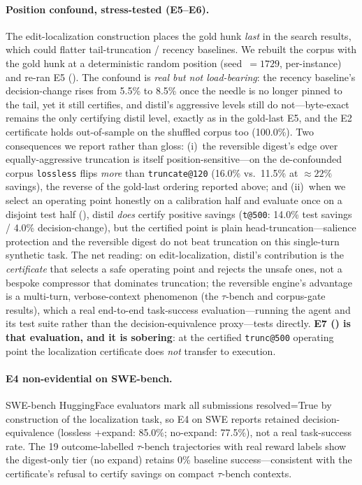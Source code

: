 \documentclass[11pt]{article}
\makeatletter
\newcommand{\OrigRecencyDC}{5.5\%}   \newcommand{\OrigRecencySav}{16.1\%}
\newcommand{\ShufRecencyDC}{8.5\%}   \newcommand{\ShufRecencySav}{15.9\%}
\newcommand{\ShufLosslessDC}{16.0\%} \newcommand{\ShufLosslessSav}{21.7\%}
\newcommand{\ShufTruncShortDC}{11.5\%} \newcommand{\ShufTruncShortSav}{22.8\%}
\newcommand{\ShufCoverage}{100.0\%}
\newcommand{\SweepPoint}{\texttt{t@500}}
\newcommand{\SweepTestSav}{14.0\%}
\newcommand{\SweepTestDC}{4.0\%}
\makeatother
\begin{document}
\paragraph{Position confound, stress-tested (E5--E6).} The edit-localization
construction places the gold hunk \emph{last} in the search results, which could
flatter tail-truncation / recency baselines. We rebuilt the corpus with the gold
hunk at a deterministic random position (seed~$=1729$, per-instance) and re-ran E5
(). The confound is \emph{real but not load-bearing}: the recency
baseline's decision-change rises from \OrigRecencyDC{} to \ShufRecencyDC{} once the
needle is no longer pinned to the tail, yet it still certifies, and distil's
aggressive levels still do not---byte-exact remains the only certifying distil level,
exactly as in the gold-last E5, and the E2 certificate holds out-of-sample on the
shuffled corpus too (\ShufCoverage{}). Two consequences we report rather than gloss:
(i)~the reversible digest's edge over equally-aggressive truncation is itself
position-sensitive---on the de-confounded corpus \texttt{lossless} flips
\emph{more} than \texttt{truncate@120} (\ShufLosslessDC{} vs.\ \ShufTruncShortDC{} at
$\approx22\%$ savings), the reverse of the gold-last ordering reported above; and
(ii)~when we select an operating point honestly on a calibration half and evaluate
once on a disjoint test half (), distil \emph{does} certify positive
savings (\SweepPoint{}: \SweepTestSav{} test savings / \SweepTestDC{} decision-change),
but the certified point is plain head-truncation---salience protection and the
reversible digest do not beat truncation on this single-turn synthetic task. The
net reading: on edit-localization, distil's contribution is the \emph{certificate}
that selects a safe operating point and rejects the unsafe ones, not a bespoke
compressor that dominates truncation; the reversible engine's advantage is a
multi-turn, verbose-context phenomenon (the $\tau$-bench and corpus-gate results),
which a real end-to-end task-success evaluation---running the agent and its test
suite rather than the decision-equivalence proxy---tests directly. \textbf{E7
() is that evaluation, and it is sobering}: at the certified
\texttt{trunc@500} operating point the localization certificate does \emph{not}
transfer to execution.

\paragraph{E4 non-evidential on SWE-bench.} SWE-bench HuggingFace evaluators mark
all submissions resolved=True by construction of the localization task, so E4 on
SWE reports retained decision-equivalence (lossless $+$expand: 85.0\%; no-expand:
77.5\%), not a real task-success rate. The 19 outcome-labelled $\tau$-bench
trajectories with real reward labels show the digest-only tier (no expand) retains
0\% baseline success---consistent with the certificate's refusal to certify savings
on compact $\tau$-bench contexts.
\end{document}
